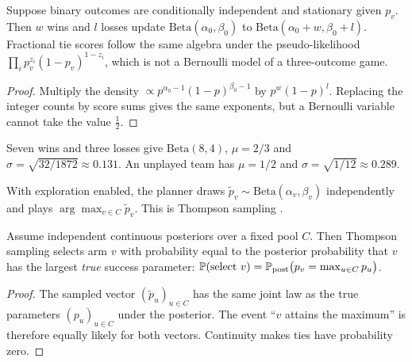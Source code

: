 \begin{proposition}
\label{prop:beta}
Suppose binary outcomes are conditionally independent and stationary given
$p_v$. Then $w$ wins and $l$ losses update $\mathrm{Beta}(\alpha_0,\beta_0)$ to
$\mathrm{Beta}(\alpha_0+w,\beta_0+l)$. Fractional tie scores follow the same
algebra under the pseudo-likelihood $\prod_ip_v^{z_i}(1-p_v)^{1-z_i}$, which
is not a Bernoulli model of a three-outcome game.
\end{proposition}
\begin{proof}
Multiply the density $\propto p^{\alpha_0-1}(1-p)^{\beta_0-1}$ by
$p^w(1-p)^l$. Replacing the integer counts by score sums gives the same
exponents, but a Bernoulli variable cannot take the value $\tfrac12$.
\end{proof}

\begin{example}
Seven wins and three losses give $\mathrm{Beta}(8,4)$, $\mu=2/3$ and
$\sigma=\sqrt{32/1872}\approx0.131$. An unplayed team has $\mu=1/2$ and
$\sigma=\sqrt{1/12}\approx0.289$.
\end{example}

With exploration enabled, the planner draws $\tilde p_v\sim
\mathrm{Beta}(\alpha_v,\beta_v)$ independently and plays
$\arg\max_{v\in C}\tilde p_v$. This is Thompson sampling \citep{thompson}.

\begin{proposition}
\label{prop:thompson}
Assume independent continuous posteriors over a fixed pool $C$. Then Thompson
sampling selects arm $v$ with probability equal to the posterior probability
that $v$ has the largest \emph{true} success parameter:
$\mathbb{P}(\text{select }v)=\mathbb{P}_{\text{post}}\big(p_v=\max_{u\in C}p_u\big)$.
\end{proposition}
\begin{proof}
The sampled vector $(\tilde p_u)_{u\in C}$ has the same joint law as the true
parameters $(p_u)_{u\in C}$ under the posterior. The event ``$v$ attains the
maximum'' is therefore equally likely for both vectors. Continuity makes ties
have probability zero.
\end{proof}



